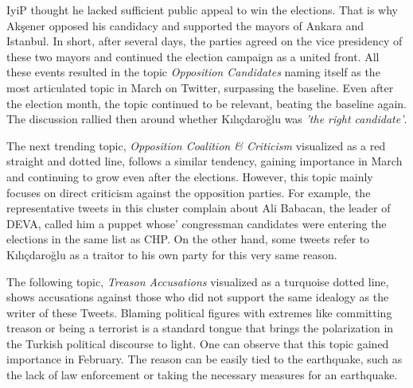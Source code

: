 \ac{IyiP} thought he lacked sufficient public appeal to win the elections. 
That is why Akşener opposed his candidacy and supported the mayors of Ankara and Istanbul. 
In short, after several days, the parties agreed on the vice presidency of these two mayors and 
continued the election campaign as a united front. All these events resulted in the topic 
\textit{Opposition Candidates} naming itself as the most articulated topic in March on Twitter, 
surpassing the baseline. Even after the election month, the topic continued to be relevant, 
beating the baseline again. The discussion rallied then around whether Kılıçdaroğlu was 
\textit{'the right candidate'}.


The next trending topic, \textit{Opposition Coalition \& Criticism} visualized as a red straight 
and dotted line, follows a similar tendency, gaining importance in March and continuing to 
grow even after the elections. However, this topic mainly focuses on direct criticism against 
the opposition parties. For example, the representative tweets in this cluster complain about 
Ali Babacan, the leader of \ac{DEVA}, called him a puppet whose' congressman candidates were 
entering the elections in the same list as \ac{CHP}. On the other hand, some tweets refer to 
Kılıçdaroğlu as a traitor to his own party for this very same reason.

The following topic, \textit{Treason Accusations} visualized as a turquoise dotted line, shows 
accusations against those who did not support the same idealogy as the writer of these Tweets. 
Blaming political figures with extremes like committing treason or being a terrorist is a standard 
tongue that brings the polarization in the Turkish political discourse to light. 
One can observe that this topic gained importance in February. The reason can be easily tied to 
the earthquake, such as the lack of law enforcement or taking the necessary measures for an 
earthquake.

